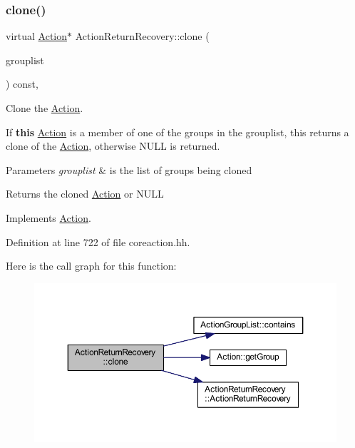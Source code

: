 \subsubsection{\texorpdfstring{clone()}{clone()}}
{\footnotesize\ttfamily virtual \mbox{\hyperlink{class_action}{Action}}$\ast$ Action\+Return\+Recovery\+::clone (\begin{DoxyParamCaption}\item[{const \mbox{\hyperlink{class_action_group_list}{Action\+Group\+List}} \&}]{grouplist }\end{DoxyParamCaption}) const\hspace{0.3cm}{\ttfamily [inline]}, {\ttfamily [virtual]}}



Clone the \mbox{\hyperlink{class_action}{Action}}. 

If {\bfseries{this}} \mbox{\hyperlink{class_action}{Action}} is a member of one of the groups in the grouplist, this returns a clone of the \mbox{\hyperlink{class_action}{Action}}, otherwise N\+U\+LL is returned. 
\begin{DoxyParams}{Parameters}
{\em grouplist} & is the list of groups being cloned \\
\hline
\end{DoxyParams}
\begin{DoxyReturn}{Returns}
the cloned \mbox{\hyperlink{class_action}{Action}} or N\+U\+LL 
\end{DoxyReturn}


Implements \mbox{\hyperlink{class_action_af8242e41d09e5df52f97df9e65cc626f}{Action}}.



Definition at line 722 of file coreaction.\+hh.

Here is the call graph for this function\+:
\nopagebreak
\begin{figure}[H]
\begin{center}
\leavevmode
\includegraphics[width=350pt]{class_action_return_recovery_a5871a6ac754811bf330d21aa2b375714_cgraph}
\end{center}
\end{figure}


